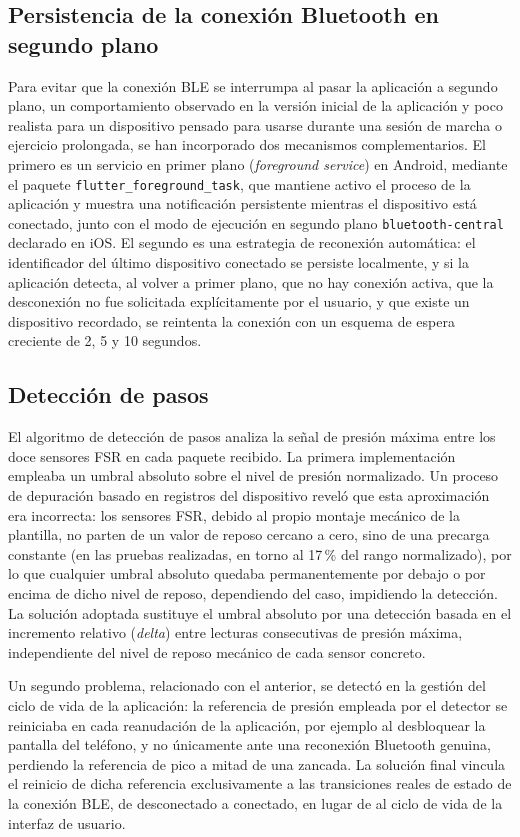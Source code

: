 \begin{IAtext}
\subsection{Persistencia de la conexión Bluetooth en segundo plano}
Para evitar que la conexión BLE se interrumpa al pasar la aplicación a segundo plano, un comportamiento observado en la versión inicial de la aplicación y poco realista para un dispositivo pensado para usarse durante una sesión de marcha o ejercicio prolongada, se han incorporado dos mecanismos complementarios. El primero es un servicio en primer plano (\textit{foreground service}) en Android, mediante el paquete \texttt{flutter\_foreground\_task}, que mantiene activo el proceso de la aplicación y muestra una notificación persistente mientras el dispositivo está conectado, junto con el modo de ejecución en segundo plano \texttt{bluetooth-central} declarado en iOS. El segundo es una estrategia de reconexión automática: el identificador del último dispositivo conectado se persiste localmente, y si la aplicación detecta, al volver a primer plano, que no hay conexión activa, que la desconexión no fue solicitada explícitamente por el usuario, y que existe un dispositivo recordado, se reintenta la conexión con un esquema de espera creciente de 2, 5 y 10 segundos.

\subsection{Detección de pasos}
El algoritmo de detección de pasos analiza la señal de presión máxima entre los doce sensores FSR en cada paquete recibido. La primera implementación empleaba un umbral absoluto sobre el nivel de presión normalizado. Un proceso de depuración basado en registros del dispositivo reveló que esta aproximación era incorrecta: los sensores FSR, debido al propio montaje mecánico de la plantilla, no parten de un valor de reposo cercano a cero, sino de una precarga constante (en las pruebas realizadas, en torno al 17\,\% del rango normalizado), por lo que cualquier umbral absoluto quedaba permanentemente por debajo o por encima de dicho nivel de reposo, dependiendo del caso, impidiendo la detección. La solución adoptada sustituye el umbral absoluto por una detección basada en el incremento relativo (\textit{delta}) entre lecturas consecutivas de presión máxima, independiente del nivel de reposo mecánico de cada sensor concreto.

Un segundo problema, relacionado con el anterior, se detectó en la gestión del ciclo de vida de la aplicación: la referencia de presión empleada por el detector se reiniciaba en cada reanudación de la aplicación, por ejemplo al desbloquear la pantalla del teléfono, y no únicamente ante una reconexión Bluetooth genuina, perdiendo la referencia de pico a mitad de una zancada. La solución final vincula el reinicio de dicha referencia exclusivamente a las transiciones reales de estado de la conexión BLE, de desconectado a conectado, en lugar de al ciclo de vida de la interfaz de usuario.


\end{IAtext}

